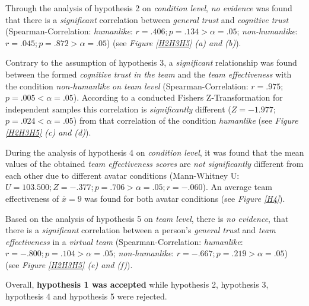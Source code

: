 \documentclass[sigchi]{acmart}
\begin{document}
Through the analysis of hypothesis 2 on \textit{condition level}, \textit{no evidence} was found that there is a \textit{significant} correlation between \textit{general trust} and \textit{cognitive trust} (Spearman-Correlation:  \textit{humanlike}: $r =.406; p =.134 > \alpha =.05$;  \textit{non-humanlike}: $r = .045; p = .872 > \alpha = .05$) (see \textit{Figure \ref{H2H3H5} (a) and (b)}). 

Contrary to the assumption of hypothesis 3, a \textit{significant} relationship was found between the formed \textit{cognitive trust in the team} and the \textit{team effectiveness} with the condition \textit{non-humanlike} \textit{on team level} (Spearman-Correlation: $r =.975$; $p =.005 < \alpha = .05$). According to a conducted Fishers Z-Transformation for independent samples \citep[p. 109]{cohen2013statistical} this correlation is \textit{significantly} different ($Z=-1.977$; $p =.024 < \alpha = .05$) from that correlation of the condition \textit{humanlike} (see \textit{Figure \ref{H2H3H5} (c) and (d)}).
 
During the analysis of hypothesis 4 on \textit{condition level}, it was found that the mean values of the obtained \textit{team effectiveness scores} are \textit{not significantly} different from each other due to different avatar conditions (Mann-Whitney U: $U = 103.500; Z = -.377; p =.706 > \alpha = .05; r = -.060$). An average team effectiveness of $\bar{x} = 9$ was found for both avatar conditions (see \textit{Figure \ref{H4}}).

Based on the analysis of hypothesis 5 on \textit{team level}, there is \textit{no evidence}, that there is a \textit{significant} correlation between a person's \textit{general trust} and \textit{team effectiveness} in a \textit{virtual team} (Spearman-Correlation:  \textit{humanlike}: $r = -.800; p =.104 > \alpha = .05$;  \textit{non-humanlike}: $r = -.667; p =.219 > \alpha = .05$) (see \textit{Figure \ref{H2H3H5} (e) and (f)}).

Overall, \textbf{hypothesis 1 was accepted} while hypothesis 2, hypothesis 3, hypothesis 4 and hypothesis 5 were rejected.
\end{document}
